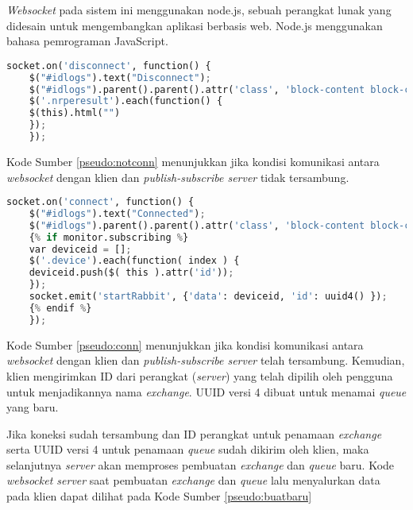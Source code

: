 \begin{enumerate}
	\textit{Websocket} pada sistem ini menggunakan node.js, sebuah perangkat lunak yang didesain untuk mengembangkan aplikasi berbasis web. Node.js menggunakan bahasa pemrograman JavaScript.\\
	
	\begin{lstlisting}[frame=single,caption={Inisiasi Komunikasi Websocket dengan Klien dan Publish-Subscribe Server Tidak Terkonesi}, breaklines=true,label=pseudo:notconn, language=python]
	socket.on('disconnect', function() {
	$("#idlogs").text("Disconnect");
	$("#idlogs").parent().parent().attr('class', 'block-content block-content-full bg-danger');
	$('.nrperesult').each(function() {
	$(this).html("")
	});
	});
	\end{lstlisting}
	
	Kode Sumber \ref{pseudo:notconn} menunjukkan jika kondisi komunikasi antara \textit{websocket} dengan klien dan \textit{publish-subscribe server} tidak tersambung.
	
	\begin{lstlisting}[frame=single,caption={Inisiasi Komunikasi Websocket dengan Klien dan Publish-Subscribe Server Terkoneksi}, breaklines=true,label=pseudo:conn, language=python]
	socket.on('connect', function() {
	$("#idlogs").text("Connected");
	$("#idlogs").parent().parent().attr('class', 'block-content block-content-full bg-success');
	{% if monitor.subscribing %}
	var deviceid = [];
	$('.device').each(function( index ) {
	deviceid.push($( this ).attr('id'));
	});
	socket.emit('startRabbit', {'data': deviceid, 'id': uuid4() });
	{% endif %}
	});
	\end{lstlisting}
	
	Kode Sumber \ref{pseudo:conn} menunjukkan jika kondisi komunikasi antara \textit{websocket} dengan klien dan \textit{publish-subscribe server} telah tersambung. Kemudian, klien mengirimkan ID dari perangkat (\textit{server}) yang telah dipilih oleh pengguna untuk menjadikannya nama \textit{exchange}. UUID versi 4 dibuat untuk menamai \textit{queue} yang baru. 
	
	Jika koneksi sudah tersambung dan ID perangkat untuk penamaan \textit{exchange} serta UUID versi 4 untuk penamaan \textit{queue} sudah dikirim oleh klien, maka selanjutnya \textit{server} akan memproses pembuatan \textit{exchange} dan \textit{queue} baru. Kode \textit{websocket server} saat pembuatan
	\textit{exchange} dan \textit{queue} lalu menyalurkan data pada klien dapat dilihat pada Kode Sumber \ref{pseudo:buatbaru}
	

\end{enumerate}
